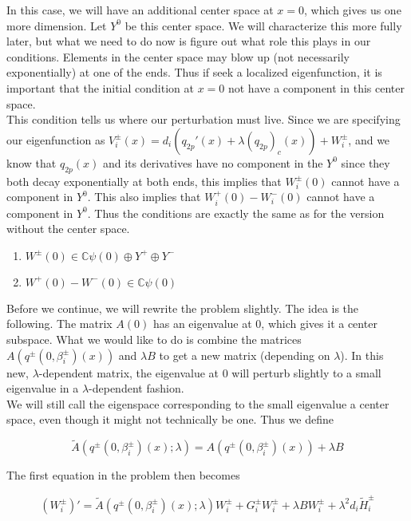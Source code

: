 \documentclass[12pt]{article}
\def\C{{\mathbb C}}
\begin{document}
In this case, we will have an additional center space at $x = 0$, which gives us one more dimension. Let $Y^0$ be this center space. We will characterize this more fully later, but what we need to do now is figure out what role this plays in our conditions. Elements in the center space may blow up (not necessarily exponentially) at one of the ends. Thus if seek a localized eigenfunction, it is important that the initial condition at $x = 0$ not have a component in this center space. \\

This condition tells us where our perturbation must live. Since we are specifying our eigenfunction as $V_i^\pm(x) = d_i(q_{2p}'(x) + \lambda (q_{2p})_c(x)) + W_i^\pm $, and we know that $q_{2p}(x)$ and its derivatives have no component in the $Y^0$ since they both decay exponentially at both ends, this implies that $W_i^\pm(0)$ cannot have a component in $Y^0$. This also implies that $W_i^+(0) - W_i^-(0)$ cannot have a component in $Y^0$. Thus the conditions are exactly the same as for the version without the center space.\\

\begin{enumerate}
\item $W^\pm(0) \in \C \psi(0) \oplus Y^+ \oplus Y^-$
\item $W^+(0) - W^-(0) \in \C \psi(0) $
\end{enumerate}

Before we continue, we will rewrite the problem slightly. The idea is the following. The matrix $A(0)$ has an eigenvalue at 0, which gives it a center subspace. What we would like to do is combine the matrices $A(q^\pm(0, \beta_i^\pm)(x)) $ and $\lambda B$ to get a new matrix (depending on $\lambda$). In this new, $\lambda$-dependent matrix, the eigenvalue at 0 will perturb slightly to a small eigenvalue in a $\lambda$-dependent fashion.\\

We will still call the eigenspace corresponding to the small eigenvalue a center space, even though it might not technically be one. Thus we define

\[
\tilde{A}(q^\pm(0, \beta_i^\pm)(x); \lambda) = A(q^\pm(0, \beta_i^\pm)(x)) + \lambda B
\]

The first equation in the problem then becomes

\[
(W_i^\pm)' = \tilde{A}(q^\pm(0, \beta_i^\pm)(x); \lambda) W_i^\pm + G_i^\pm W_i^\pm + \lambda B W_i^\pm + \lambda^2 d_i \tilde{H}_i^\pm
\]
\end{document}
